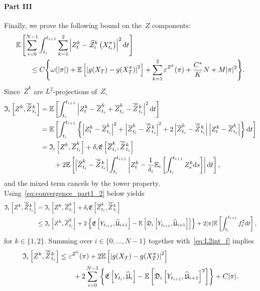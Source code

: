 \paragraph{\textbf{Part III}} 
Finally, we prove the following bound on the~$Z$ components:
\begin{align}\label{eq:convergence_part3_result}
\begin{split}
 &\mathbb{E}\left[\sum_{i=0}^{N-1} \int_{t_i}^{t_{i+1}}\sum_{k=1}^2\left|Z_t^k-\widehat{\mathcal{Z}}^k_i\left(X^\pi_{t_i}\right)\right|^2 \mathrm{d} t\right] \\
 &\qquad\leq C\Bigg\{\omega(|\pi|) + \mathbb{E}\left[\left|g(X_T)-g(X^\pi_T)\right|^2\right]+\sum_{k=1}^2\varepsilon^{Z^k}(\pi)+\frac{C^{*}}{K}N + M|\pi|^2\Bigg\}.
 \end{split}
\end{align}
Since~$\overline{Z}^k$ are $L^2$-projections of~$Z$,
\begin{align*}
\mathfrak{I}_i\left[Z^k, \overline{\widehat{Z}}\kern0.1em^{k}_{t_i}\right] 
&= \mathbb{E}\left[\int_{t_i}^{t_{i+1}}\left|Z^k_t - \overline{Z}^{k}_{t_{i}} + \overline{Z}^{k}_{t_{i}} - \overline{\widehat{Z}}\kern0.1em^{k}_{t_{i}}\right|^2\mathrm{d} t\right] \\
 &= \mathbb{E}\left[ \int_{t_i}^{t_{i+1}}\left\{
 \left|Z^k_t - \overline{Z}^{k}_{t_{i}}\right|^2 + \left|\overline{Z}^{k}_{t_{i}} - \overline{\widehat{Z}}\kern0.1em^{k}_{t_{i}}\right|^2 +
 2
 \left|\overline{Z}^{k}_{t_{i}} - \overline{\widehat{Z}}\kern0.1em^{k}_{t_{i}}\right|
 \left|Z^k_t - \overline{Z}^{k}_{t_{i}}\right|
 \right\}\mathrm{d} t \right]\\
 &= \mathfrak{I}_i\left[Z^k, \overline{Z}^{k}_{t_i}\right] + \delta_{i} \mathfrak{E}\left[\overline{Z}^k_{t_i}, \overline{\widehat{Z}}\kern0.1em^{k}_{t_i}\right] \\
 &\qquad + 2\mathbb{E}\left[\left|\overline{Z}^{k}_{t_{i}} - \overline{\widehat{Z}}\kern0.1em^{k}_{t_{i}}\right| \int_{t_i}^{t_{i+1}}\left|Z^k_t - \frac{1}{\delta_{i}} \mathbb{E}_{i}\left[\int_{t_{i}}^{t_{i+1}} Z^k_{s} \mathrm{d} s\right]\right| \mathrm{d} t \right],
\end{align*}
and the mixed term cancels by the tower property. 
Using~\eqref{eq:convergence_part1_2} below yields
\begin{align*}
\mathfrak{I}_i\left[Z^k, \overline{\widehat{Z}}\kern0.1em^{k}_{t_i}\right]
& =\mathfrak{I}_i\left[Z^k, \overline{Z}^{k}_{t_i}\right] + \delta_{i} \mathfrak{E}\left[\overline{Z}^k_{t_i}, \overline{\widehat{Z}}\kern0.1em^{k}_{t_i}\right] \\
&\leq \mathfrak{I}_i\left[Z^k, \overline{Z}^{k}_{t_i}\right] +  2 \left\{\mathfrak{E}\left[Y_{t_{i+1}}, \widehat{\mathfrak{U}}_{i+1}\right]
 - \mathbb{E}\left[\mathfrak{D}_i\left[Y_{t_{i+1}}, \widehat{\mathfrak{U}}_{i+1}\right]\right]\right\}
 + 2 |\pi| \mathbb{E}\left[\int_{t_i}^{t_{i+1}}f_{t}^2 \mathrm{d} t\right],
\end{align*}
for $k\in\{1,2\}$. 
Summing over $i\in\{0,\dots,N-1\}$ together with~\eqref{eq:L2int_f} implies
\begin{equation}\label{eq:convergence_part3_0}
\begin{aligned}
\mathfrak{I}_i\left[Z^k, \overline{\widehat{Z}}\kern0.1em^{k}_{t_i}\right] &\leq \varepsilon^{Z^k}(\pi) + 2\mathbb{E}\left[\left|g(X_T)-g(X^\pi_T)\right|^2\right] \\
& \qquad + 2\sum_{i=0}^{N-1}\left\{\mathfrak{E}\left[Y_{t_i}, \widehat{\mathfrak{U}}_{i}\right] - \mathbb{E}\left[\mathfrak{D}_i\left[Y_{t_{i+1}}, \widehat{\mathfrak{U}}_{i+1}\right]^{2}\right]\right\} + C|\pi|.
\end{aligned}
\end{equation}

